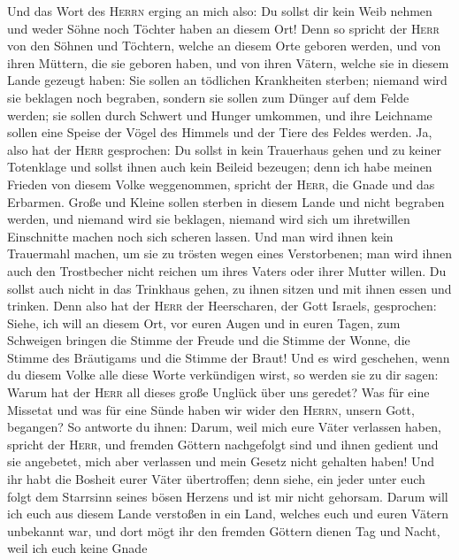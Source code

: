  Und das Wort des \textsc{Herrn} erging an mich also: Du
sollst dir kein Weib nehmen  und weder Söhne noch Töchter
haben an diesem Ort!  Denn so spricht der \textsc{Herr}
von den Söhnen und Töchtern, welche an diesem Orte geboren werden, und
von ihren Müttern, die sie geboren haben, und von ihren Vätern, welche
sie in diesem Lande gezeugt haben:  Sie sollen an
tödlichen Krankheiten sterben; niemand wird sie beklagen noch begraben,
sondern sie sollen zum Dünger auf dem Felde werden; sie sollen durch
Schwert und Hunger umkommen, und ihre Leichname sollen eine Speise der
Vögel des Himmels und der Tiere des Feldes werden.  Ja,
also hat der \textsc{Herr} gesprochen: Du sollst in kein Trauerhaus
gehen und zu keiner Totenklage und sollst ihnen auch kein Beileid
bezeugen; denn ich habe meinen Frieden von diesem Volke weggenommen,
spricht der \textsc{Herr}, die Gnade und das Erbarmen. 
Große und Kleine sollen sterben in diesem Lande und nicht begraben
werden, und niemand wird sie beklagen, niemand wird sich um ihretwillen
Einschnitte machen noch sich scheren lassen.  Und man wird
ihnen kein Trauermahl machen, um sie zu trösten wegen eines
Verstorbenen; man wird ihnen auch den Trostbecher nicht reichen um ihres
Vaters oder ihrer Mutter willen.  Du sollst auch nicht in
das Trinkhaus gehen, zu ihnen sitzen und mit ihnen essen und trinken.
 Denn also hat der \textsc{Herr} der Heerscharen, der Gott
Israels, gesprochen: Siehe, ich will an diesem Ort, vor euren Augen und
in euren Tagen, zum Schweigen bringen die Stimme der Freude und die
Stimme der Wonne, die Stimme des Bräutigams und die Stimme der Braut!
 Und es wird geschehen, wenn du diesem Volke alle diese
Worte verkündigen wirst, so werden sie zu dir sagen: Warum hat der
\textsc{Herr} all dieses große Unglück über uns geredet? Was für eine
Missetat und was für eine Sünde haben wir wider den \textsc{Herrn},
unsern Gott, begangen?  So antworte du ihnen: Darum, weil
mich eure Väter verlassen haben, spricht der \textsc{Herr}, und fremden
Göttern nachgefolgt sind und ihnen gedient und sie angebetet, mich aber
verlassen und mein Gesetz nicht gehalten haben!  Und ihr
habt die Bosheit eurer Väter übertroffen; denn siehe, ein jeder unter
euch folgt dem Starrsinn seines bösen Herzens und ist mir nicht
gehorsam.  Darum will ich euch aus diesem Lande verstoßen
in ein Land, welches euch und euren Vätern unbekannt war, und dort mögt
ihr den fremden Göttern dienen Tag und Nacht, weil ich euch keine Gnade
